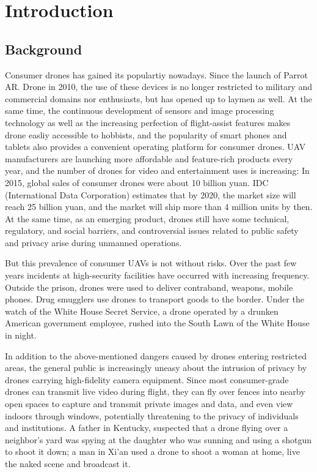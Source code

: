 \documentclass{sig-alternate-10pt}
\begin{document}
\section{Introduction}
\subsection{Background}
Consumer drones has gained its populartiy nowadays. Since the launch of Parrot AR. Drone in 2010, the use of these devices is no longer restricted to military and commercial domains nor enthusiasts, but has opened up to laymen as well. At the same time, the continuous development of sensors and image processing technology as well as the increasing perfection of flight-assist features makes drone easliy accessible to hobbists, and the popularity of smart phones and tablets also provides a convenient operating platform for consumer drones. UAV manufacturers are launching more affordable and feature-rich products every year, and the number of drones for video and entertainment uses is increasing: In 2015, global sales of consumer drones were about 10 billion yuan. IDC (International Data Corporation) estimates that by 2020, the market size will reach 25 billion yuan, and the market will ship more than 4 million units by then. At the same time, as an emerging product, drones still have some technical, regulatory, and social barriers, and controversial issues related to public safety and privacy arise during unmanned operations.

But this prevalence of consumer UAVs is not without risks. Over the past few years incidents at high-security facilities have occurred with increasing frequency. Outside the prison, drones were used to deliver contraband, weapons, mobile phones. Drug smugglers use drones to transport goods to the border. Under the watch of the White House Secret Service, a drone operated by a drunken American government employee, rushed into the South Lawn of the White House in night.

In addition to the above-mentioned dangers caused by drones entering restricted areas, the general public is increasingly uneasy about the intrusion of privacy by drones carrying high-fidelity camera equipment. Since most consumer-grade drones can transmit live video during flight, they can fly over fences into nearby open spaces to capture and transmit private images and data, and even view indoors through windows, potentially threatening to the privacy of individuals and institutions. A father in Kentucky, suspected that a drone flying over a neighbor's yard was spying at the daughter who was sunning and using a shotgun to shoot it down; a man in Xi'an used a drone to shoot a woman at home, live the naked scene and broadcast it.
 
\end{document}
